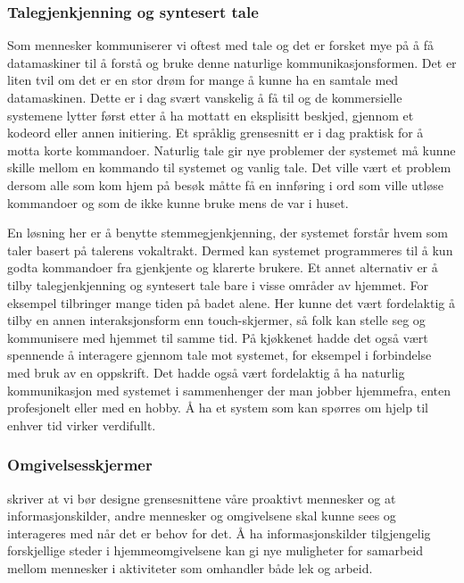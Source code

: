 \subsubsection*{Talegjenkjenning og syntesert tale}
Som mennesker kommuniserer vi oftest med tale og det er forsket mye på å få datamaskiner til å forstå og bruke denne naturlige kommunikasjonsformen. Det er liten tvil om det er en stor drøm for mange å kunne ha en samtale med datamaskinen. Dette er i dag svært vanskelig å få til og de kommersielle systemene lytter først etter å ha mottatt en eksplisitt beskjed, gjennom et kodeord eller annen initiering. Et språklig grensesnitt er i dag praktisk for å motta korte kommandoer. Naturlig tale gir nye problemer der systemet må kunne skille mellom en kommando til systemet og vanlig tale. Det ville vært et problem dersom alle som kom hjem på besøk måtte få en innføring i ord som ville utløse kommandoer og som de ikke kunne bruke mens de var i huset.

En løsning her er å benytte stemmegjenkjenning, der systemet forstår hvem som taler basert på talerens vokaltrakt. Dermed kan systemet programmeres til å kun godta kommandoer fra gjenkjente og klarerte brukere. Et annet alternativ er å tilby talegjenkjenning og syntesert tale bare i visse områder av hjemmet. For eksempel tilbringer mange tiden på badet alene. Her kunne det vært fordelaktig å tilby en annen interaksjonsform enn touch-skjermer, så folk kan stelle seg og kommunisere med hjemmet til samme tid. På kjøkkenet hadde det også vært spennende å interagere gjennom tale mot systemet, for eksempel i forbindelse med bruk av en oppskrift. Det hadde også vært fordelaktig å ha naturlig kommunikasjon med systemet i sammenhenger der man jobber hjemmefra, enten profesjonelt eller med en hobby. Å ha et system som kan spørres om hjelp til enhver tid virker verdifullt. 

\subsubsection*{Omgivelsesskjermer}
\citet{rogers06} skriver at vi bør designe grensesnittene våre proaktivt mennesker og at informasjonskilder, andre mennesker og omgivelsene skal kunne sees og interageres med når det er behov for det. Å ha informasjonskilder tilgjengelig forskjellige steder i hjemmeomgivelsene kan gi nye muligheter for samarbeid mellom mennesker i aktiviteter som omhandler både lek og arbeid.

